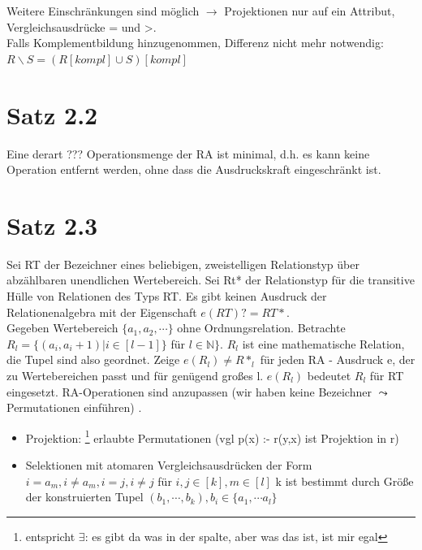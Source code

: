 \documentclass[12pt, a4paper]{article}
\begin{document}
Weitere Einschränkungen sind möglich $\rightarrow$ Projektionen nur auf ein Attribut, Vergleichsausdrücke = und >. \\
Falls Komplementbildung hinzugenommen, Differenz nicht mehr notwendig: \\
$R \backslash S = (R[kompl] \cup S)[kompl]$

\section*{Satz 2.2}
Eine derart ??? Operationsmenge der RA ist minimal, d.h. es kann keine Operation entfernt werden, ohne dass die Ausdruckskraft eingeschränkt ist.

\section*{Satz 2.3}
Sei RT der Bezeichner eines beliebigen, zweistelligen Relationstyp über abzählbaren unendlichen Wertebereich. Sei Rt* der Relationstyp für die transitive Hülle von Relationen des Typs RT. Es gibt keinen Ausdruck  der Relationenalgebra mit der Eigenschaft $e(RT) ? = RT*$. \\

Gegeben Wertebereich $\{a_1, a_2, \cdots \}$ ohne Ordnungsrelation. Betrachte $R_l = \{ (a_i, a_i+1) | i \in [l-1] \}$ für $l \in \mathbb{N} \}$. $R_l$ ist eine mathematische Relation, die Tupel sind also geordnet. Zeige $e(R_l) \neq R*_l$ für jeden RA - Ausdruck e, der zu Wertebereichen passt und für genügend großes l. $e(R_l)$ bedeutet $R_l$ für RT eingesetzt. RA-Operationen sind anzupassen (wir haben keine Bezeichner $\leadsto$ Permutationen einführen) .
\begin{itemize}
	\item Projektion: \footnote{entspricht $\exists$: es gibt da was in der spalte, aber was das ist, ist mir egal} erlaubte Permutationen (vgl p(x) :- r(y,x) ist Projektion in r)
	\item Selektionen mit atomaren Vergleichsausdrücken der Form $i = a_m, i \neq a_m, i = j, i \neq j$ für $i,j \in [k], m \in [l]$ k ist bestimmt durch Größe der konstruierten Tupel $(b_1, \cdots, b_k), b_i \in \{a_1, \cdots a_l \}$
\end{itemize}
\end{document}
